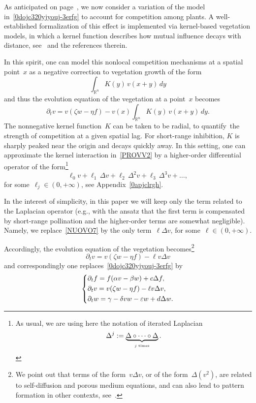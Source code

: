 \documentclass[12pt]{amsart}
\newcommand{\R}{\mathbb{R}}
\renewcommand{\epsilon}{\varepsilon}
\numberwithin{equation}{section}
\begin{document}
As anticipated on page~\pageref{ANTIP6}, we now consider
a variation of the model in~\eqref{0dojc320yjyouj-3erfg} to account for competition among plants. A well-established formalization of this effect is implemented via kernel-based vegetation models, in which a kernel function describes how mutual influence decays with distance, see~\cite[equation~(25)]{LEFD} and the references therein.

In this spirit, one can model this nonlocal competition mechanisms at a spatial point~$x$ as a negative correction to vegetation growth of the form
\begin{equation}\label{PROVV2} \int_{\R^n} K(y)\,v(x+y)\,dy\end{equation}
and thus the evolution equation of the vegetation at a point~$x$ becomes
\begin{equation*}\partial_t v=v(\zeta w-\eta f)-v(x)\int_{\R^n} K(y)\,v(x+y)\,dy.\end{equation*}
The nonnegative kernel function~$K$ can be taken to be radial, to quantify the strength of competition at a given spatial lag.
For short-range inhibition, $K$ is sharply peaked near the origin and decays quickly away.
In this setting, one can approximate the kernel interaction in~\eqref{PROVV2}
by a higher-order differential operator of the form\footnote{As usual, we are using here the notation
of iterated Laplacian
$$\Delta^j:=\underbrace{\Delta\circ\cdots\circ\Delta}_{\text{\tiny{$j$ times}}}.$$}
\begin{equation}\label{NUOVO7}
\ell_0 v+\ell_1\,{\Delta} v+\ell_2\,\Delta^2 v+\ell_3\,{\Delta}^3 v+\dots,\end{equation}
for some~$\ell_j\in(0,+\infty)$, see Appendix~\ref{0apjclrgh}.

In the interest of simplicity, in this paper we will keep only the term related to the Laplacian operator (e.g., with the ansatz that the first term is compensated by short-range pollination and the higher-order terms are somewhat negligible). Namely, we replace~\eqref{NUOVO7} by the only term~$\ell{\Delta} v$, for some~$\ell\in(0,+\infty)$.

Accordingly, the evolution equation of the vegetation becomes\footnote{We point out that terms of the form~$v\Delta v$,
or of the form~$\Delta (v^2)$, are related to self-diffusion 
and porous medium equations, 
and can also lead to
pattern formation in other contexts, see~\cite{LOUSELF}.}
$$ \partial_t v=v(\zeta w-\eta f)-\ell v{\Delta} v$$
and correspondingly one replaces~\eqref{0dojc320yjyouj-3erfg} by
\begin{equation}\label{NUOVO}
\begin{dcases}
\partial_t f=f(\alpha v-\beta w)+c\Delta f, \\
\partial_t v=v(\zeta w-\eta f)-\ell v{\Delta} v,\\
\partial_t w=\gamma-\delta v w-\epsilon w+d\Delta w.
\end{dcases}
\end{equation}
\end{document}
